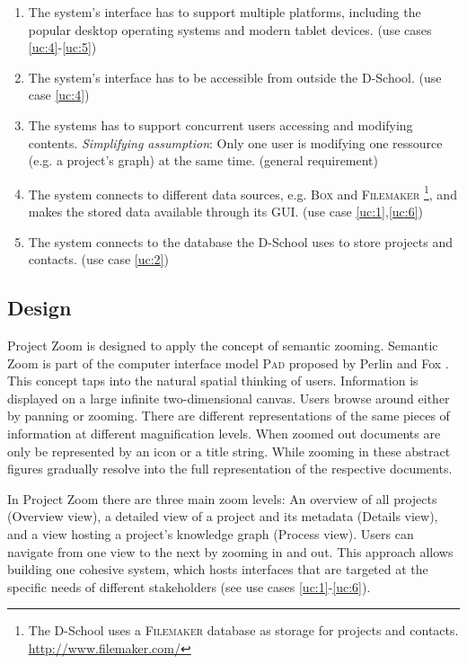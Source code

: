 \begin{enumerate}
\item The system's interface has to support multiple platforms, including the popular desktop operating systems and modern tablet devices. (use cases \ref{uc:4}-\ref{uc:5}) \label{req:1}
\item The system's interface has to be accessible from outside the D-School. (use case \ref{uc:4}) \label{req:2}
\item The systems has to support concurrent users accessing and modifying contents. \textit{Simplifying assumption}: Only one user is modifying one ressource (e.g. a project's graph) at the same time. (general requirement) \label{req:3}
\item The system connects to different data sources, e.g. \textsc{Box} and \textsc{Filemaker} \footnote{The D-School uses a \textsc{Filemaker} database as storage for projects and contacts. \url{http://www.filemaker.com/}}, and makes the stored data available through its GUI. (use case \ref{uc:1},\ref{uc:6}) \label{req:4}
\item The system connects to the database the D-School uses to store projects and contacts. (use case \ref{uc:2}) \label{req:4}

\end{enumerate}

\subsection{Design}

Project Zoom is designed to apply the concept of semantic zooming. Semantic Zoom is part of the computer interface model \textsc{Pad} proposed by Perlin and Fox \cite{Perlin_1993}. This concept taps into the natural spatial thinking of users. Information is displayed on a large infinite two-dimensional canvas. Users browse around either by panning or zooming. There are different representations of the same pieces of information at different magnification levels. When zoomed out documents are only be represented by an icon or a title string. While zooming in these abstract figures gradually resolve into the full representation of the respective documents. 

In Project Zoom there are three main zoom levels: An overview of all projects (Overview view), a detailed view of a project and its metadata (Details view), and a view hosting a project's knowledge graph (Process view). Users can navigate from one view to the next by zooming in and out. This approach allows building one cohesive system, which hosts interfaces that are targeted at the specific needs of different stakeholders (see use cases \ref{uc:1}-\ref{uc:6}).

